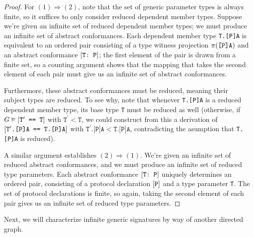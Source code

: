 \documentclass[../generics]{subfiles}
\begin{document}
\begin{proof}
For $(1)\Rightarrow(2)$, note that the set of generic parameter types is always finite, so it suffices to only consider reduced dependent member types. Suppose we're given an infinite set of reduced dependent member types; we must produce an infinite set of abstract conformances. Each dependent member type \texttt{T.[P]A} is equivalent to an ordered pair consisting of a type witness projection $\pi(\texttt{[P]A})$ and an abstract conformance $[\texttt{T:~P}]$; the first element of the pair is drawn from a finite set, so a counting argument shows that the mapping that takes the second element of each pair must give us an infinite set of abstract conformances.

Furthermore, these abstract conformances must be reduced, meaning their subject types are reduced. To see why, note that whenever \texttt{T.[P]A} is a reduced dependent member type, its base type \texttt{T} must be reduced as well (otherwise, if $G\vDash[\texttt{$\texttt{T}^\prime$ == T}]$ with $\texttt{T}^\prime<\texttt{T}$, we could construct from this a derivation of $[\texttt{$\texttt{T}^\prime$.[P]A == T.[P]A}]$ with $\texttt{$\texttt{T}^\prime$.[P]A} < \texttt{T.[P]A}$, contradicting the asumption that \texttt{T.[P]A} is reduced).

A similar argument establishes $(2)\Rightarrow(1)$. We're given an infinite set of reduced abstract conformances, and we must produce an infinite set of reduced type parameters. Each abstract conformance $[\texttt{T:~P}]$ uniquely determines an ordered pair, consisting of a protocol declaration $[\texttt{P}]$ and a type parameter \texttt{T}. The set of protocol declarations is finite, so again, taking the second element of each pair gives us an infinite set of reduced type parameters.
\end{proof}

Next, we will characterize infinite generic signatures by way of another directed graph.
\end{document}
